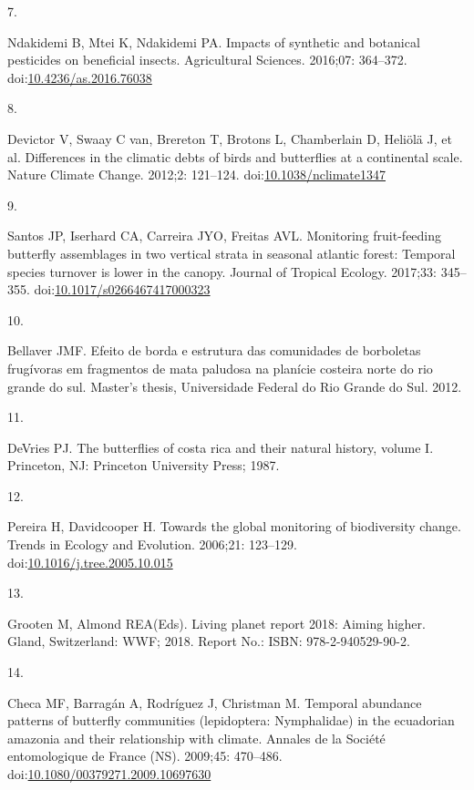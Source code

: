 \documentclass[
  letterpaper,
]{scrbook}
\newlength{\cslhangindent}
\newlength{\csllabelwidth}
\newenvironment{CSLReferences}[2] %
 {\begin{list}{}{%
  \setlength{\itemindent}{0pt}
  \setlength{\leftmargin}{0pt}
  \setlength{\parsep}{0pt}
  \ifodd #1
   \setlength{\leftmargin}{\cslhangindent}
   \setlength{\itemindent}{-1\cslhangindent}
  \fi
  \setlength{\itemsep}{#2\baselineskip}}}
 {\end{list}}
\newcommand{\CSLLeftMargin}[1]{\parbox[t]{\csllabelwidth}{\strut#1\strut}}
\newcommand{\CSLRightInline}[1]{\parbox[t]{\linewidth - \csllabelwidth}{\strut#1\strut}}
\begin{document}
\begin{CSLReferences}{0}{1}
\CSLLeftMargin{7. }%
\CSLRightInline{Ndakidemi B, Mtei K, Ndakidemi PA. Impacts of synthetic
and botanical pesticides on beneficial insects. Agricultural Sciences.
2016;07: 364--372.
doi:\href{https://doi.org/10.4236/as.2016.76038}{10.4236/as.2016.76038}}

\CSLLeftMargin{8. }%
\CSLRightInline{Devictor V, Swaay C van, Brereton T, Brotons L,
Chamberlain D, Heliölä J, et al. Differences in the climatic debts of
birds and butterflies at a continental scale. Nature Climate Change.
2012;2: 121--124.
doi:\href{https://doi.org/10.1038/nclimate1347}{10.1038/nclimate1347}}

\CSLLeftMargin{9. }%
\CSLRightInline{Santos JP, Iserhard CA, Carreira JYO, Freitas AVL.
Monitoring fruit-feeding butterfly assemblages in two vertical strata in
seasonal atlantic forest: Temporal species turnover is lower in the
canopy. Journal of Tropical Ecology. 2017;33: 345--355.
doi:\href{https://doi.org/10.1017/s0266467417000323}{10.1017/s0266467417000323}}

\CSLLeftMargin{10. }%
\CSLRightInline{Bellaver JMF. Efeito de borda e estrutura das
comunidades de borboletas frugívoras em fragmentos de mata paludosa na
planície costeira norte do rio grande do sul. Master's thesis,
Universidade Federal do Rio Grande do Sul. 2012. }

\CSLLeftMargin{11. }%
\CSLRightInline{DeVries PJ. The butterflies of costa rica and their
natural history, volume {I}. Princeton, NJ: Princeton University Press;
1987. }

\CSLLeftMargin{12. }%
\CSLRightInline{Pereira H, Davidcooper H. Towards the global monitoring
of biodiversity change. Trends in Ecology and Evolution. 2006;21:
123--129.
doi:\href{https://doi.org/10.1016/j.tree.2005.10.015}{10.1016/j.tree.2005.10.015}}

\CSLLeftMargin{13. }%
\CSLRightInline{Grooten M, Almond REA(Eds). Living planet report 2018:
Aiming higher. Gland, Switzerland: WWF; 2018. Report No.: ISBN:
978-2-940529-90-2. }

\CSLLeftMargin{14. }%
\CSLRightInline{Checa MF, Barragán A, Rodríguez J, Christman M. Temporal
abundance patterns of butterfly communities (lepidoptera: Nymphalidae)
in the ecuadorian amazonia and their relationship with climate. Annales
de la Société entomologique de France (NS). 2009;45: 470--486.
doi:\href{https://doi.org/10.1080/00379271.2009.10697630}{10.1080/00379271.2009.10697630}}


\end{CSLReferences}
\end{document}
